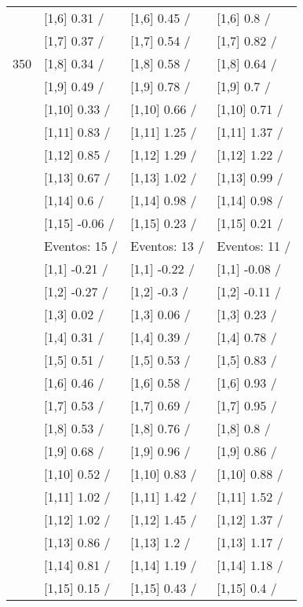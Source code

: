 \begin{table}
\begin{tabular}[t]{llll}
 & {}[1,6] 0.31  / & {}[1,6] 0.45  / & {}[1,6] 0.8  /\\
 & {}[1,7] 0.37  / & {}[1,7] 0.54  / & {}[1,7] 0.82  /\\
350 & {}[1,8] 0.34  / & {}[1,8] 0.58  / & {}[1,8] 0.64  /\\
\addlinespace
 & {}[1,9] 0.49  / & {}[1,9] 0.78  / & {}[1,9] 0.7  /\\
 & {}[1,10] 0.33  / & {}[1,10] 0.66  / & {}[1,10] 0.71  /\\
 & {}[1,11] 0.83  / & {}[1,11] 1.25  / & {}[1,11] 1.37  /\\
 & {}[1,12] 0.85  / & {}[1,12] 1.29  / & {}[1,12] 1.22  /\\
 & {}[1,13] 0.67  / & {}[1,13] 1.02  / & {}[1,13] 0.99  /\\
\addlinespace
 & {}[1,14] 0.6  / & {}[1,14] 0.98  / & {}[1,14] 0.98  /\\
 & {}[1,15] -0.06  / & {}[1,15] 0.23  / & {}[1,15] 0.21  /\\
 & Eventos:  15 / & Eventos:  13 / & Eventos:  11 /\\
 & {}[1,1] -0.21  / & {}[1,1] -0.22  / & {}[1,1] -0.08  /\\
 & {}[1,2] -0.27  / & {}[1,2] -0.3  / & {}[1,2] -0.11  /\\
\addlinespace
 & {}[1,3] 0.02  / & {}[1,3] 0.06  / & {}[1,3] 0.23  /\\
 & {}[1,4] 0.31  / & {}[1,4] 0.39  / & {}[1,4] 0.78  /\\
 & {}[1,5] 0.51  / & {}[1,5] 0.53  / & {}[1,5] 0.83  /\\
 & {}[1,6] 0.46  / & {}[1,6] 0.58  / & {}[1,6] 0.93  /\\
 & {}[1,7] 0.53  / & {}[1,7] 0.69  / & {}[1,7] 0.95  /\\
\addlinespace
500 & {}[1,8] 0.53  / & {}[1,8] 0.76  / & {}[1,8] 0.8  /\\
 & {}[1,9] 0.68  / & {}[1,9] 0.96  / & {}[1,9] 0.86  /\\
 & {}[1,10] 0.52  / & {}[1,10] 0.83  / & {}[1,10] 0.88  /\\
 & {}[1,11] 1.02  / & {}[1,11] 1.42  / & {}[1,11] 1.52  /\\
 & {}[1,12] 1.02  / & {}[1,12] 1.45  / & {}[1,12] 1.37  /\\
\addlinespace
 & {}[1,13] 0.86  / & {}[1,13] 1.2  / & {}[1,13] 1.17  /\\
 & {}[1,14] 0.81  / & {}[1,14] 1.19  / & {}[1,14] 1.18  /\\
 & {}[1,15] 0.15  / & {}[1,15] 0.43  / & {}[1,15] 0.4  /\\
\bottomrule
\end{tabular}
\end{table}
